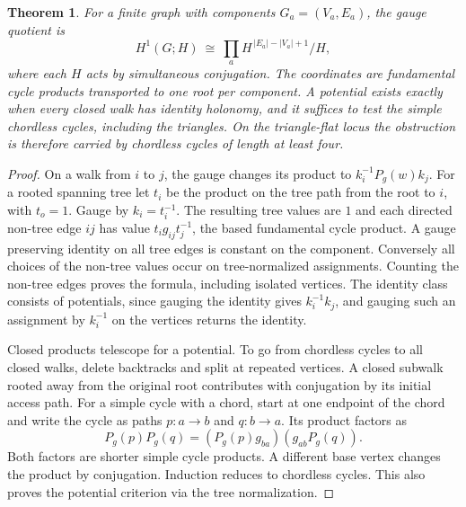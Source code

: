 \documentclass[11pt,reqno]{amsart}
\newtheorem{theorem}{Theorem}[section]
\theoremstyle{definition}
\theoremstyle{remark}
\numberwithin{equation}{section}
\begin{document}
\begin{theorem}\label{m1:gauge}
For a finite graph with components \(G_a=(V_a,E_a)\), the gauge
quotient is
\[
 H^1(G;H)\ \cong\
 \prod_a H^{\,|E_a|-|V_a|+1}/H ,
\]
where each \(H\) acts by simultaneous conjugation. The coordinates
are fundamental cycle products transported to one root per
component. A potential exists exactly when every closed walk has
identity holonomy, and it suffices to test the simple chordless
cycles, including the triangles. On the triangle-flat locus the
obstruction is therefore carried by chordless cycles of length at
least four.
\end{theorem}
\begin{proof}
On a walk from \(i\) to \(j\), the gauge changes its product to
\(k_i^{-1}P_g(w)k_j\). For a rooted spanning tree let \(t_i\) be
the product on the tree path from the root to \(i\), with \(t_o=1\).
Gauge by \(k_i=t_i^{-1}\). The resulting tree values are \(1\)
and each directed non-tree edge \(ij\) has value
\(t_i g_{ij}t_j^{-1}\), the based fundamental cycle product.
A gauge preserving identity on all tree edges is constant on
the component. Conversely all choices of the non-tree values
occur on tree-normalized assignments. Counting the non-tree
edges proves the formula, including isolated vertices. The
identity class consists of potentials, since gauging the identity gives
\(k_i^{-1}k_j\), and gauging such an assignment by \(k_i^{-1}\)
on the vertices returns the identity.

Closed products telescope for a potential. To go from chordless
cycles to all closed walks, delete backtracks and split at repeated
vertices. A closed subwalk rooted away from the original root
contributes with conjugation by its initial access path. For a
simple cycle with a chord, start at one endpoint of the chord
and write the cycle as paths \(p:a\to b\) and \(q:b\to a\).
Its product factors as
\[
 P_g(p)P_g(q)=(P_g(p)g_{ba})(g_{ab}P_g(q)).
\]
Both factors are shorter simple cycle products. A different base
vertex changes the product by conjugation. Induction reduces to
chordless cycles. This also proves the potential criterion via the
tree normalization.
\end{proof}
\end{document}
